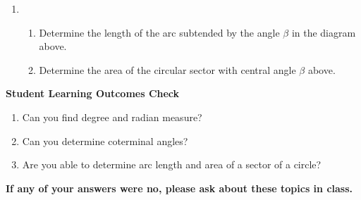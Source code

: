 \begin{enumerate}
\item
  \begin{enumerate}
  \item Determine the length of the arc subtended by the angle $\beta$
    in the diagram above.
    
    \vfill
    
  \item Determine the area of the circular sector with central angle $\beta$ above.
    \vfill
  \end{enumerate}
\end{enumerate}

\noindent \textbf{Student Learning Outcomes Check}

\begin{enumerate}
\item Can you find degree and radian measure?
\item Can you determine coterminal angles?
\item Are you able to determine arc length and area of a sector of a circle?
\end{enumerate}

\noindent \textbf{If any of your answers were no, please ask about these topics in class.}

